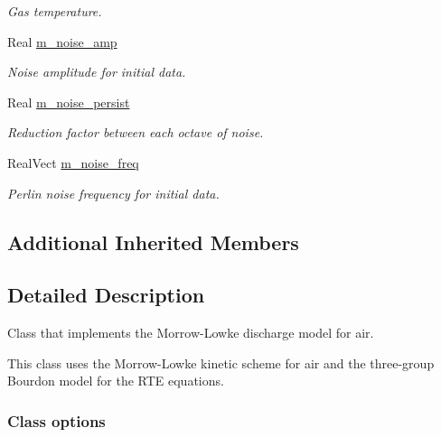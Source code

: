 \begin{DoxyCompactItemize}
\begin{DoxyCompactList}\small\item\em Gas temperature. \end{DoxyCompactList}\item 
Real \hyperlink{classmorrow__lowke_a30c8b51a1b43a80d17cd9212d8ea9b0f}{m\+\_\+noise\+\_\+amp}
\begin{DoxyCompactList}\small\item\em Noise amplitude for initial data. \end{DoxyCompactList}\item 
Real \hyperlink{classmorrow__lowke_a76ea00933cfa6b6585f91a2b53e6c1c1}{m\+\_\+noise\+\_\+persist}
\begin{DoxyCompactList}\small\item\em Reduction factor between each octave of noise. \end{DoxyCompactList}\item 
Real\+Vect \hyperlink{classmorrow__lowke_a094345f4a8b83fa62ff0698c6da30f93}{m\+\_\+noise\+\_\+freq}
\begin{DoxyCompactList}\small\item\em Perlin noise frequency for initial data. \end{DoxyCompactList}\end{DoxyCompactItemize}
\subsection*{Additional Inherited Members}


\subsection{Detailed Description}
Class that implements the Morrow-\/\+Lowke discharge model for air. 

This class uses the Morrow-\/\+Lowke kinetic scheme for air and the three-\/group Bourdon model for the R\+TE equations.

\subsubsection*{Class options }

